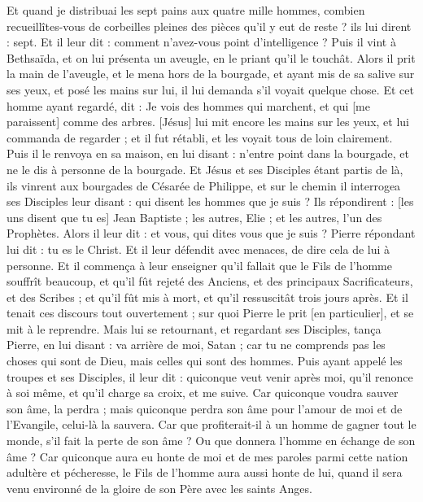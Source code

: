 \begin{multicols}{2}
Et quand je distribuai les sept pains aux quatre mille hommes, combien recueillîtes-vous de corbeilles pleines des pièces qu'il y eut de reste ? ils lui dirent : sept.
Et il leur dit : comment n'avez-vous point d'intelligence ?
Puis il vint à Bethsaïda, et on lui présenta un aveugle, en le priant qu'il le touchât.
Alors il prit la main de l'aveugle, et le mena hors de la bourgade, et ayant mis de sa salive sur ses yeux, et posé les mains sur lui, il lui demanda s'il voyait quelque chose.
Et cet homme ayant regardé, dit : Je vois des hommes qui marchent, et qui [me paraissent] comme des arbres.
[Jésus] lui mit encore les mains sur les yeux, et lui commanda de regarder ; et il fut rétabli, et les voyait tous de loin clairement.
Puis il le renvoya en sa maison, en lui disant : n'entre point dans la bourgade, et ne le dis à personne de la bourgade.
Et Jésus et ses Disciples étant partis de là, ils vinrent aux bourgades de Césarée de Philippe, et sur le chemin il interrogea ses Disciples leur disant : qui disent les hommes que je suis ?
Ils répondirent : [les uns disent que tu es] Jean Baptiste ; les autres, Elie ; et les autres, l'un des Prophètes.
Alors il leur dit : et vous, qui dites vous que je suis ? Pierre répondant lui dit : tu es le Christ.
Et il leur défendit avec menaces, de dire cela de lui à personne.
Et il commença à leur enseigner qu'il fallait que le Fils de l'homme souffrît beaucoup, et qu'il fût rejeté des Anciens, et des principaux Sacrificateurs, et des Scribes ; et qu'il fût mis à mort, et qu'il ressuscitât trois jours après.
Et il tenait ces discours tout ouvertement ; sur quoi Pierre le prit [en particulier], et se mit à le reprendre.
Mais lui se retournant, et regardant ses Disciples, tança Pierre, en lui disant : va arrière de moi, Satan ; car tu ne comprends pas les choses qui sont de Dieu, mais celles qui sont des hommes.
Puis ayant appelé les troupes et ses Disciples, il leur dit : quiconque veut venir après moi, qu'il renonce à soi même, et qu'il charge sa croix, et me suive.
Car quiconque voudra sauver son âme, la perdra ; mais quiconque perdra son âme pour l'amour de moi et de l'Evangile, celui-là la sauvera.
Car que profiterait-il à un homme de gagner tout le monde, s'il fait la perte de son âme ?
Ou que donnera l'homme en échange de son âme ?
Car quiconque aura eu honte de moi et de mes paroles parmi cette nation adultère et pécheresse, le Fils de l'homme aura aussi honte de lui, quand il sera venu environné de la gloire de son Père avec les saints Anges.

\end{multicols}
